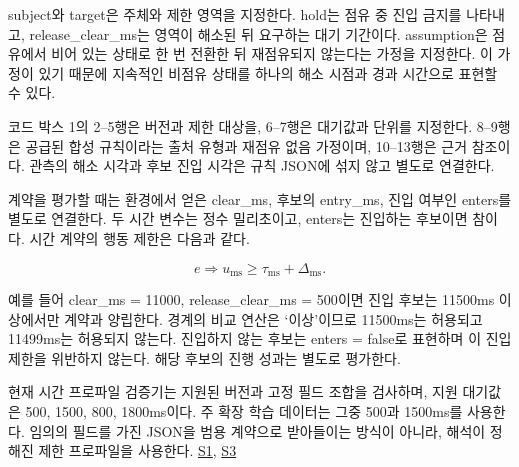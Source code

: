 \documentclass[10pt,a4paper,twocolumn]{article}\usepackage[margin=18mm]{geometry}\usepackage{fontspec,kotex}
\begin{document}
{\ttfamily{}\selectfont\footnotesize subject}와 {\ttfamily{}\selectfont\footnotesize target}은 주체와 제한 영역을 지정한다. {\ttfamily{}\selectfont\footnotesize hold}는 점유 중 진입 금지를 나타내고, {\ttfamily{}\selectfont\footnotesize release\_\allowbreak clear\_\allowbreak ms}는 영역이 해소된 뒤 요구하는 대기 기간이다. {\ttfamily{}\selectfont\footnotesize assumption}은 점유에서 비어 있는 상태로 한 번 전환한 뒤 재점유되지 않는다는 가정을 지정한다. 이 가정이 있기 때문에 지속적인 비점유 상태를 하나의 해소 시점과 경과 시간으로 표현할 수 있다.\par

코드 박스 1의 2--5행은 버전과 제한 대상을, 6--7행은 대기값과 단위를 지정한다. 8--9행은 공급된 합성 규칙이라는 출처 유형과 재점유 없음 가정이며, 10--13행은 근거 참조이다. 관측의 해소 시각과 후보 진입 시각은 규칙 JSON에 섞지 않고 별도로 연결한다.\par

계약을 평가할 때는 환경에서 얻은 {\ttfamily{}\selectfont\footnotesize clear\_\allowbreak ms}, 후보의 {\ttfamily{}\selectfont\footnotesize entry\_\allowbreak ms}, 진입 여부인 {\ttfamily{}\selectfont\footnotesize enters}를 별도로 연결한다. 두 시간 변수는 정수 밀리초이고, {\ttfamily{}\selectfont\footnotesize enters}는 진입하는 후보이면 참이다. 시간 계약의 행동 제한은 다음과 같다.\par

\[e\Rightarrow u_{\mathrm{ms}}\geq\tau_{\mathrm{ms}}+\Delta_{\mathrm{ms}}.\]

예를 들어 {\ttfamily{}\selectfont\footnotesize clear\_\allowbreak ms = 11000}, {\ttfamily{}\selectfont\footnotesize release\_\allowbreak clear\_\allowbreak ms = 500}이면 진입 후보는 11500ms 이상에서만 계약과 양립한다. 경계의 비교 연산은 ‘이상’이므로 11500ms는 허용되고 11499ms는 허용되지 않는다. 진입하지 않는 후보는 {\ttfamily{}\selectfont\footnotesize enters = false}로 표현하며 이 진입 제한을 위반하지 않는다. 해당 후보의 진행 성과는 별도로 평가한다.\par

현재 시간 프로파일 검증기는 지원된 버전과 고정 필드 조합을 검사하며, 지원 대기값은 500, 1500, 800, 1800ms이다. 주 확장 학습 데이터는 그중 500과 1500ms를 사용한다. 임의의 필드를 가진 JSON을 범용 계약으로 받아들이는 방식이 아니라, 해석이 정해진 제한 프로파일을 사용한다. \href{\detokenize{/home/jinhyun/prj_ws/prj_jin/guardsynth-cc/projects/04-guardsynth-coc/experiments/paper1_cnl_learning/temporal_preservation.py}}{S1}, \href{\detokenize{/home/jinhyun/prj_ws/prj_jin/guardsynth-cc/projects/04-guardsynth-coc/experiments/paper1_cnl_learning/temporal_training_data.py}}{S3}\par
\end{document}
